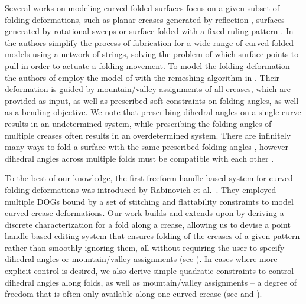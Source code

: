  Several works on modeling curved folded surfaces focus on a given subset of folding deformations, such as planar creases generated by reflection \cite{mitani2012column,Mitani_ref}, surfaces generated by rotational sweeps \cite{mitani2009design} or surface folded with a fixed ruling pattern \cite{pottmann_new}. In \cite{StringActuated:2017} the authors simplify the process of fabrication for a wide range of curved folded models using a network of strings, solving the problem of which surface points to pull in order to actuate a folding movement. To model the folding deformation the authors of \cite{StringActuated:2017} employ the model of \cite{botsch2006primo} with the remeshing algorithm in \cite{narain2012adaptive}. Their deformation is guided by mountain/valley assignments of all creases, which are provided as input, as well as prescribed soft constraints on folding angles, as well as a bending objective. We note that prescribing dihedral angles on a single curve results in an undetermined system, while prescribing the folding angles of multiple creases often results in an overdetermined system. There are infinitely many ways to fold a surface with the same prescribed folding angles \cite{more_on_paper,duncan_folded}, however dihedral angles across multiple folds must be compatible with each other \cite{demaine2018conic}. 

To the best of our knowledge, the first freeform handle based system for curved folding deformations was introduced by Rabinovich et al.~.  They employed multiple DOGs bound by a set of stitching and flattability constraints to model curved crease deformations. Our work builds and extends upon \cite{rabi2018shape} by deriving a discrete characterization for a fold along a crease, allowing us to devise a point handle based editing system that ensures folding of the creases of a given pattern rather than smoothly ignoring them, all without requiring the user to specify dihedral angles or mountain/valley assignments (see ). In cases where more explicit control is desired, we also derive simple quadratic constraints to control dihedral angles along folds, as well as mountain/valley assignments -- a degree of freedom that is often only available along one curved crease (see  and ).